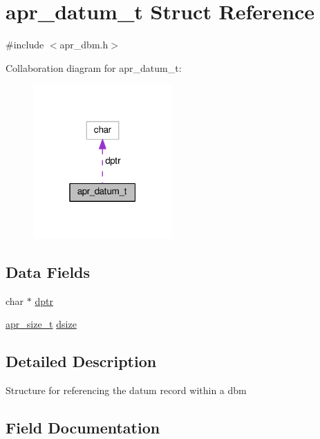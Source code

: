 \hypertarget{structapr__datum__t}{}\section{apr\+\_\+datum\+\_\+t Struct Reference}
\label{structapr__datum__t}


{\ttfamily \#include $<$apr\+\_\+dbm.\+h$>$}



Collaboration diagram for apr\+\_\+datum\+\_\+t\+:
\nopagebreak
\begin{figure}[H]
\begin{center}
\leavevmode
\includegraphics[width=151pt]{structapr__datum__t__coll__graph}
\end{center}
\end{figure}
\subsection*{Data Fields}
\begin{DoxyCompactItemize}
\item 
char $\ast$ \hyperlink{structapr__datum__t_a7f4e0997f26d818c5674446ebb3d58bb}{dptr}
\item 
\hyperlink{group__apr__platform_gaaa72b2253f6f3032cefea5712a27540e}{apr\+\_\+size\+\_\+t} \hyperlink{structapr__datum__t_a5b58c23a5f65a8a6e3f8228fef5e429c}{dsize}
\end{DoxyCompactItemize}


\subsection{Detailed Description}
Structure for referencing the datum record within a dbm 

\subsection{Field Documentation}
